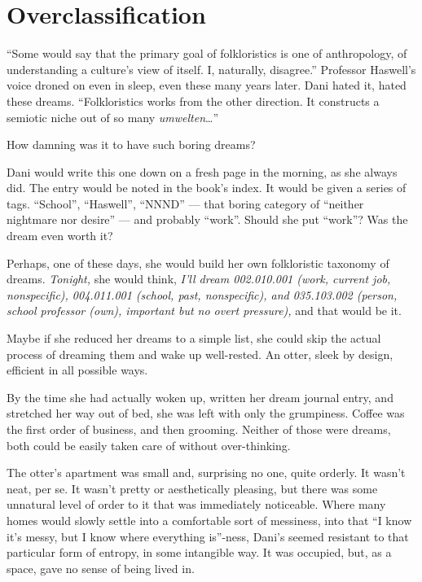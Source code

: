 \chapter{Overclassification}\label{overclassification}

``Some would say that the primary goal of folkloristics is one of anthropology, of understanding a culture's view of itself. I, naturally, disagree.'' Professor Haswell's voice droned on even in sleep, even these many years later. Dani hated it, hated these dreams. ``Folkloristics works from the other direction. It constructs a semiotic niche out of so many \emph{umwelten}\ldots{}''

How damning was it to have such boring dreams?

Dani would write this one down on a fresh page in the morning, as she always did. The entry would be noted in the book's index. It would be given a series of tags. ``School'', ``Haswell'', ``NNND'' --- that boring category of ``neither nightmare nor desire'' --- and probably ``work''. Should she put ``work''? Was the dream even worth it?

Perhaps, one of these days, she would build her own folkloristic taxonomy of dreams. \emph{Tonight,} she would think, \emph{I'll dream 002.010.001 (work, current job, nonspecific), 004.011.001 (school, past, nonspecific), and 035.103.002 (person, school professor (own), important but no overt pressure),} and that would be it.

Maybe if she reduced her dreams to a simple list, she could skip the actual process of dreaming them and wake up well-rested. An otter, sleek by design, efficient in all possible ways.

By the time she had actually woken up, written her dream journal entry, and stretched her way out of bed, she was left with only the grumpiness. Coffee was the first order of business, and then grooming. Neither of those were dreams, both could be easily taken care of without over-thinking.

The otter's apartment was small and, surprising no one, quite orderly. It wasn't neat, per se. It wasn't pretty or aesthetically pleasing, but there was some unnatural level of order to it that was immediately noticeable. Where many homes would slowly settle into a comfortable sort of messiness, into that ``I know it's messy, but I know where everything is''-ness, Dani's seemed resistant to that particular form of entropy, in some intangible way. It was occupied, but, as a space, gave no sense of being lived in.

